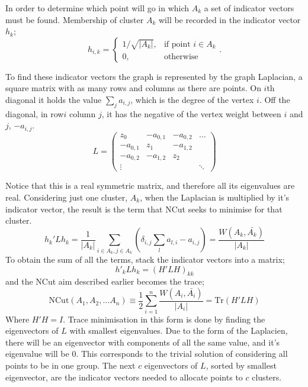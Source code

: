 In order to determine which point will go in which \(A_k\) a set of indicator vectors must be found.
Membership of cluster \(A_k\) will be recorded in the indicator vector \(h_k\);
\begin{equation}
    h_{i, k}= 
    \begin{cases}
        1/\sqrt{|A_k|},& \text{if point } i \in A_k \\
        0,              & \text{otherwise}
    \end{cases}
    .
\end{equation}

To find these indicator vectors the graph is represented by the graph Laplacian, a square
matrix with as many rows and columns as there are points.
On \(i\)th diagonal it holds the value \(\sum_j a_{i, j}\),
which is the degree of the vertex \(i\).
Off the diagonal, in row\(i\) column \(j\), it has the negative of the vertex weight between \(i\) and \(j\), \(-a_{i, j}\).
\begin{equation}\label{eqn:unnormed_laplacian}
    L = 
    \begin{pmatrix}
        z_0 & -a_{0,1} & -a_{0,2} & \hdots \\
        -a_{0,1} & z_1 & -a_{1,2} & \\
        -a_{0,2} & -a_{1,2} & z_2 & \\
        \vdots   &          &     & \ddots 
    \end{pmatrix}
\end{equation}

Notice that this is a real symmetric matrix,
and therefore all its eigenvalues are real.
Considering just one cluster, \(A_k\), when the Laplacian is multiplied by it's indicator vector,
the result is the term that NCut seeks to minimise for that cluster.
\begin{equation}
    h_k'Lh_k = \frac{1}{|A_k|}\sum_{i \in A_k, j \in A_k} \left(\delta_{i, j}\sum_{l} a_{l, i} - a_{i, j} \right) = \frac{W(A_k, \bar{A_k})}{|A_k|}
\end{equation}
To obtain the sum of all the terms, stack the indicator vectors into a matrix;
\begin{equation} h'_k L h_k = (H'L H)_{kk}\end{equation}
and the NCut aim described earlier becomes the trace;
\begin{equation} \text{NCut}(A_1,A_2, \dots A_n) \equiv \frac{1}{2} \sum_{i=1}^n \frac{W(A_i, \bar{A_i})}{|A_i|} = \text{Tr}(H'LH)\end{equation}
Where \(H'H = I\).
Trace minimisation in this form is done
by finding the eigenvectors of \(L\) with smallest 
eigenvalues.
Due to the form of the Laplacien, there will be an eigenvector with components of all the same value, and it's eigenvalue will be \(0\).
This corresponds to the trivial solution of considering all points to be in one group.
The next \(c\) eigenvectors of \(L\), sorted by smallest eigenvector, are the indicator vectors needed to allocate points to \(c\) clusters.

